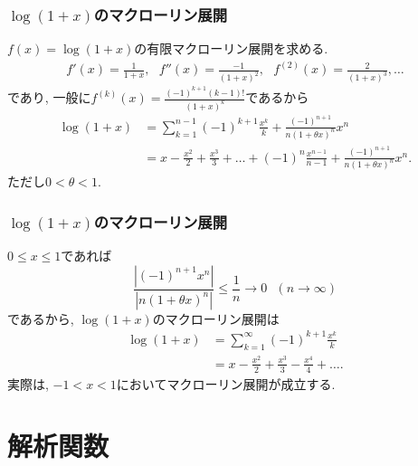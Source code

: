 


\begin{frame}
\frametitle{$\log(1+x)$のマクローリン展開}

$f(x)=\log(1+x)$の有限マクローリン展開を求める. 
\begin{align*}
f'(x)=\frac{1}{1+x}, \ \ \  f''(x)=\frac{-1}{(1+x)^2}, \ \ \  f^{(2)}(x)=\frac{2}{(1+x)^3}, \dots
\end{align*}
であり, 一般に$f^{(k)}(x)=\frac{(-1)^{k+1}(k-1)!}{(1+x)^{k}}$であるから
\begin{align*}
\log(1+x) &= \sum_{k=1}^{n-1}(-1)^{k+1}\frac{x^k}{k}+\frac{(-1)^{n+1}}{n(1+\theta x)^{n}}x^n \\
& = x-\frac{x^2}{2}+\frac{x^3}{3}+ \dots +(-1)^{n}\frac{x^{n-1}}{n-1}+\frac{(-1)^{n+1}}{n(1+\theta x)^{n}}x^n. 
\end{align*}
ただし$0<\theta < 1$. 

\end{frame}






\begin{frame}
\frametitle{$\log(1+x)$のマクローリン展開}

$0\le x\le 1$であれば
$$
\frac{|(-1)^{n+1}x^n|}{|n(1+\theta x)^{n}|} \le \frac{1}{n} \to 0 \ \ \ (n\to \infty)
$$
であるから, $\log(1+x)$のマクローリン展開は
\begin{align*}
\log(1+x) & =  \sum_{k=1}^{\infty}(-1)^{k+1}\frac{x^k}{k} \\
& =  x-\frac{x^2}{2}+\frac{x^3}{3} - \frac{x^4}{4}+\dots.
\end{align*}
実際は, $-1<x<1$においてマクローリン展開が成立する. 

\end{frame}



\section{解析関数}

